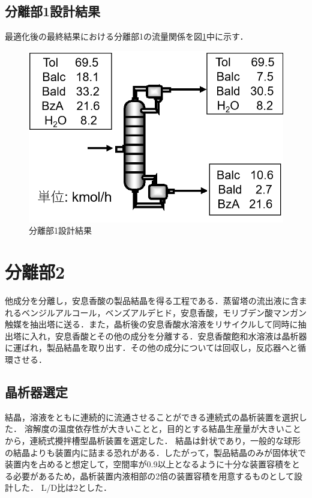 \documentclass[a4j]{jsreport}
\begin{document}
\section{分離部1設計結果}
最適化後の最終結果における分離部1の流量関係を図\ref{分離部1設計結果の図}中に示す．
\begin{figure}[htbp]
  \centering
  \includegraphics[scale=0.7]{Separation1Conclusion.png}
  \caption{分離部1設計結果}
  \label{分離部1設計結果の図}
\end{figure}


\clearpage
\chapter{分離部2}
他成分を分離し，安息香酸の製品結晶を得る工程である．蒸留塔の流出液に含まれるベンジルアルコール，ベンズアルデヒド，安息香酸，モリブデン酸マンガン触媒を抽出塔に送る．また，晶析後の安息香酸水溶液をリサイクルして同時に抽出塔に入れ，安息香酸とその他の成分を分離する．安息香酸飽和水溶液は晶析器に運ばれ，製品結晶を取り出す．その他の成分については回収し，反応器へと循環させる．

\section{晶析器選定}
結晶，溶液をともに連続的に流通させることができる連続式の晶析装置を選択した．
溶解度の温度依存性が大きいことと，目的とする結晶生産量が大きいことから，連続式攪拌槽型晶析装置を選定した．
結晶は針状であり，一般的な球形の結晶よりも装置内に詰まる恐れがある\cite{化工便覧}．したがって，製品結晶のみが固体状で装置内を占めると想定して，空間率が0.9以上となるように十分な装置容積をとる必要があるため，晶析装置内液相部の2倍の装置容積を用意するものとして設計した．
L/D比は2とした．
\end{document}
